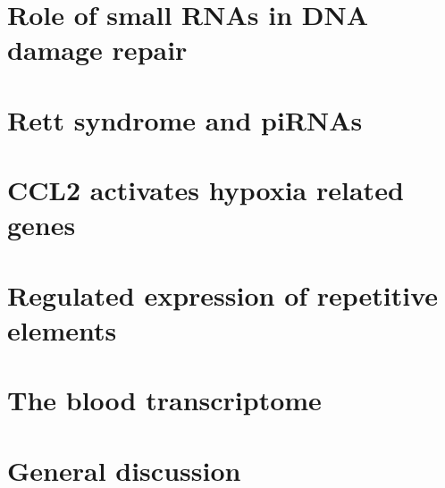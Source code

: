 \documentclass[10pt,a4paper]{report}
\begin{document}
\chapter{Role of small RNAs in DNA damage repair}



\chapter{Rett syndrome and piRNAs}



\chapter{CCL2 activates hypoxia related genes}


\chapter{Regulated expression of repetitive elements}


\chapter{The blood transcriptome}


%

\chapter{General discussion}




\end{document}

